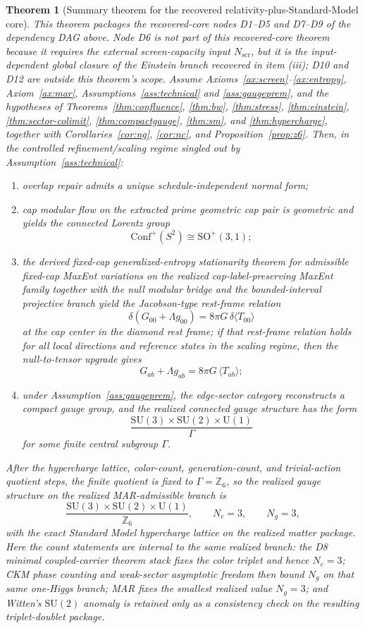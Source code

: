 \documentclass[11pt]{article}
\newtheorem{theorem}{Theorem}[section]
\newcommand{\SU}{\mathrm{SU}}
\newcommand{\U}{\mathrm{U}}
\newcommand{\Conf}{\mathrm{Conf}}
\begin{document}
\begin{theorem}[Summary theorem for the recovered relativity-plus-Standard-Model core]\label{thm:master}
This theorem packages the recovered-core nodes D1--D5 and D7--D9 of the dependency DAG above. Node D6 is not part of this recovered-core theorem because it requires the external screen-capacity input \(N_{\mathrm{scr}}\), but it is the input-dependent global closure of the Einstein branch recovered in item (iii); D10 and D12 are outside this theorem's scope. Assume Axioms~\ref{ax:screen}--\ref{ax:entropy}, Axiom~\ref{ax:mar}, Assumptions~\ref{ass:technical} and \ref{ass:gaugeprem}, and the hypotheses of Theorems~\ref{thm:confluence}, \ref{thm:bw}, \ref{thm:stress}, \ref{thm:einstein}, \ref{thm:sector-colimit}, \ref{thm:compactgauge}, \ref{thm:sm}, and \ref{thm:hypercharge}, together with Corollaries~\ref{cor:ng}, \ref{cor:nc}, and Proposition~\ref{prop:z6}. Then, in the controlled refinement/scaling regime singled out by Assumption~\ref{ass:technical}:
\begin{enumerate}[label=(\roman*),leftmargin=2em]
\item overlap repair admits a unique schedule-independent normal form;
\item cap modular flow on the extracted prime geometric cap pair is geometric and yields the connected Lorentz group
\[
\Conf^+(S^2)\cong \mathrm{SO}^+(3,1);
\]
\item the derived fixed-cap generalized-entropy stationarity theorem for admissible fixed-cap MaxEnt variations on the realized cap-label-preserving MaxEnt family together with the null modular bridge and the bounded-interval projective branch yield the Jacobson-type rest-frame relation
\[
\delta\!\left(G_{00}+\Lambda g_{00}\right)=8\pi G\,\delta\langle T_{00}\rangle
\]
at the cap center in the diamond rest frame; if that rest-frame relation holds for all local directions and reference states in the scaling regime, then the null-to-tensor upgrade gives
\[
G_{ab}+\Lambda g_{ab}=8\pi G\,\langle T_{ab}\rangle;
\]
\item under Assumption~\ref{ass:gaugeprem}, the edge-sector category reconstructs a compact gauge group, and the realized connected gauge structure has the form
\[
\frac{\SU(3)\times\SU(2)\times\U(1)}{\Gamma}
\]
for some finite central subgroup \(\Gamma\).
\end{enumerate}
After the hypercharge lattice, color-count, generation-count, and trivial-action quotient steps, the finite quotient is fixed to \(\Gamma=\mathbb Z_6\), so the realized gauge structure on the realized MAR-admissible branch is
\[
\frac{\SU(3)\times\SU(2)\times\U(1)}{\mathbb Z_6},
\qquad
N_c=3,
\qquad
N_g=3,
\]
with the exact Standard Model hypercharge lattice on the realized matter package. Here the count statements are internal to the same realized branch: the D8 minimal coupled-carrier theorem stack fixes the color triplet and hence \(N_c=3\); CKM phase counting and weak-sector asymptotic freedom then bound \(N_g\) on that same one-Higgs branch; MAR fixes the smallest realized value \(N_g=3\); and Witten's \(\SU(2)\) anomaly is retained only as a consistency check on the resulting triplet-doublet package.
\end{theorem}
\end{document}
